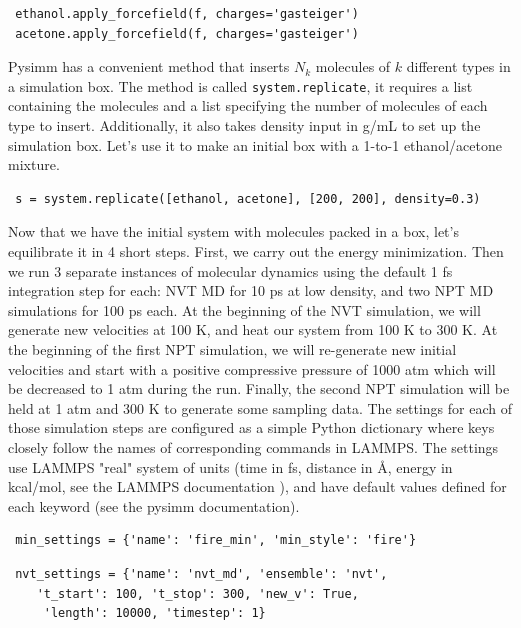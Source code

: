 \documentclass[9pt,tutorial]{livecoms}
\begin{document}
\begin{lstlisting}
 ethanol.apply_forcefield(f, charges='gasteiger')
 acetone.apply_forcefield(f, charges='gasteiger')
\end{lstlisting}

Pysimm has a convenient method that inserts $N_k$ molecules of $k$ different types in a simulation box. The method is called \lstinline$system.replicate$, it requires a list containing the molecules and a list specifying the number of molecules of each type to insert. Additionally, it also takes density input in g/mL to set up the simulation box. Let's use it to make an initial box with a 1-to-1 ethanol/acetone mixture.

\begin{lstlisting}
 s = system.replicate([ethanol, acetone], [200, 200], density=0.3)
\end{lstlisting}

Now that we have the initial system with molecules packed in a box, let's equilibrate it in 4 short steps. First, we carry out the energy minimization. Then we run 3 separate instances of molecular dynamics using the default 1 fs integration step for each: NVT MD for 10 ps at low density, and two NPT MD simulations for 100 ps each. At the beginning of the NVT simulation, we will generate new velocities at 100 K, and heat our system from 100 K to 300 K. At the beginning of the first NPT simulation, we will re-generate new initial velocities and start with a positive compressive pressure of 1000 atm which will be decreased to 1 atm during the run. Finally, the second NPT simulation will be held at 1 atm and 300 K to generate some sampling data. The settings for each of those simulation steps are configured as a simple Python dictionary where keys closely follow the names of corresponding commands in LAMMPS. The settings use LAMMPS "real" system of units (time in fs, distance in $\si{\angstrom}$, energy in kcal/mol, see the LAMMPS documentation \cite{lmps:units}), and have default values defined for each keyword (see the pysimm documentation).

\begin{lstlisting}
 min_settings = {'name': 'fire_min', 'min_style': 'fire'}
\end{lstlisting}

\begin{lstlisting}
 nvt_settings = {'name': 'nvt_md', 'ensemble': 'nvt',
    't_start': 100, 't_stop': 300, 'new_v': True,
     'length': 10000, 'timestep': 1}
\end{lstlisting}
\end{document}
